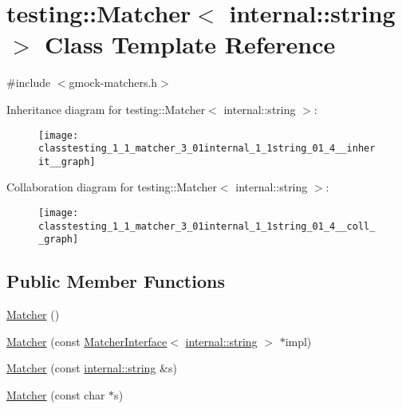 \hypertarget{classtesting_1_1_matcher_3_01internal_1_1string_01_4}{}\section{testing\+:\+:Matcher$<$ internal\+:\+:string $>$ Class Template Reference}
\label{classtesting_1_1_matcher_3_01internal_1_1string_01_4}


{\ttfamily \#include $<$gmock-\/matchers.\+h$>$}



Inheritance diagram for testing\+:\+:Matcher$<$ internal\+:\+:string $>$\+:
\nopagebreak
\begin{figure}[H]
\begin{center}
\leavevmode
\texttt{[image: classtesting\_1\_1\_matcher\_3\_01internal\_1\_1string\_01\_4\_\_inherit\_\_graph]}
\end{center}
\end{figure}


Collaboration diagram for testing\+:\+:Matcher$<$ internal\+:\+:string $>$\+:
\nopagebreak
\begin{figure}[H]
\begin{center}
\leavevmode
\texttt{[image: classtesting\_1\_1\_matcher\_3\_01internal\_1\_1string\_01\_4\_\_coll\_\_graph]}
\end{center}
\end{figure}
\subsection*{Public Member Functions}
\begin{DoxyCompactItemize}
\item 
\hyperlink{classtesting_1_1_matcher_3_01internal_1_1string_01_4_ad0c4da71efc8f5b8a07f279fa2bcb392}{Matcher} ()
\item 
\hyperlink{classtesting_1_1_matcher_3_01internal_1_1string_01_4_a03a7b1b4a93b762685e2f46d6255d493}{Matcher} (const \hyperlink{classtesting_1_1_matcher_interface}{Matcher\+Interface}$<$ \hyperlink{namespacetesting_1_1internal_a8e8ff5b11e64078831112677156cb111}{internal\+::string} $>$ $\ast$impl)
\item 
\hyperlink{classtesting_1_1_matcher_3_01internal_1_1string_01_4_ae2d21038e4dcc25776187d8bff1665f3}{Matcher} (const \hyperlink{namespacetesting_1_1internal_a8e8ff5b11e64078831112677156cb111}{internal\+::string} \&s)
\item 
\hyperlink{classtesting_1_1_matcher_3_01internal_1_1string_01_4_a65f1d7616edb049ac059ad5d3fa2d625}{Matcher} (const char $\ast$s)
\end{DoxyCompactItemize}
